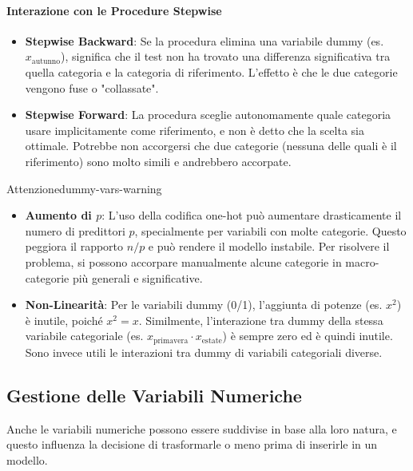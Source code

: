 \paragraph{Interazione con le Procedure Stepwise}
\begin{itemize}
    \item \textbf{Stepwise Backward}: Se la procedura elimina una variabile
    dummy (es. \(x_{\text{autunno}}\)), significa che il test non ha trovato una
    differenza significativa tra quella categoria e la categoria di riferimento.
    L'effetto è che le due categorie vengono fuse o "collassate".
    \item \textbf{Stepwise Forward}: La procedura sceglie autonomamente quale
    categoria usare implicitamente come riferimento, e non è detto che la
    scelta sia ottimale. Potrebbe non accorgersi che due categorie (nessuna
    delle quali è il riferimento) sono molto simili e andrebbero accorpate.
\end{itemize}

\begin{nota}{Attenzione}{dummy-vars-warning}
\begin{itemize}
    \item \textbf{Aumento di \(p\)}: L'uso della codifica one-hot può aumentare
    drasticamente il numero di predittori \(p\), specialmente per variabili con
    molte categorie. Questo peggiora il rapporto \(n/p\) e può rendere il
    modello instabile. Per risolvere il problema, si possono accorpare
    manualmente alcune categorie in macro-categorie più generali e
    significative.
    \item \textbf{Non-Linearità}: Per le variabili dummy (0/1), l'aggiunta di
    potenze (es. \(x^2\)) è inutile, poiché \(x^2=x\). Similmente,
    l'interazione tra dummy della stessa variabile categoriale (es.
    \(x_{\text{primavera}} \cdot x_{\text{estate}}\)) è sempre zero ed è
    quindi inutile. Sono invece utili le interazioni tra dummy di variabili
    categoriali diverse.
\end{itemize}
\end{nota}

\subsection{Gestione delle Variabili Numeriche}

Anche le variabili numeriche possono essere suddivise in base alla loro natura,
e questo influenza la decisione di trasformarle o meno prima di inserirle in un
modello.

